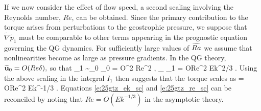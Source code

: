 \textcolor{\revtxt}{If we now consider the effect of flow speed, a second scaling involving the Reynolds number, $Re$, can be obtained. Since the primary contribution to the torque arises from perturbations to the geostrophic pressure, we suppose that $\widetilde{\nabla} \widetilde{p}_1$ must be comparable to other terms appearing in the prognostic equation governing the QG dynamics. For sufficiently large values of $\widetilde{Ra}$ we assume that nonlinearities become as large as pressure gradients. In the QG theory, $\widetilde{\mathbf{u}}_{0}=O(Re \delta),$ so that
\be
\widetilde{\nabla} _1 \sim \widetilde{\ub}_0 \cdot \widetilde{\nabla} \widetilde{\ub}_0 = O\lb \delta^2 Re^2 \rb, \qquad \Rightarrow \qquad \widetilde{\partial}_{\phi}  _1 = O\lb Re^2 Ek^{2/3} \rb .
\ee
Using the above scaling in the integral $I_1$ then suggests that the torque scales as
\be
\Gtz = O\lb \ep Re^2 Ek^{-1/3} \rb .
\label{e:25gtz_re_sc}
\ee
Equations \eqref{e:25gtz_ek_sc} and \eqref{e:25gtz_re_sc} can be reconciled by noting that $Re=O(Ek^{-1/3}) $ in the asymptotic theory.
}



